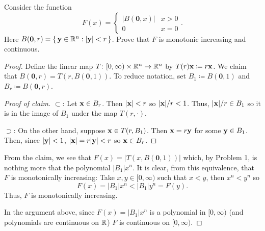 \begin{problem}
Consider the function
\[
F(x)=
\begin{cases}
|B(\mathbf{0},x)|&x>0\\
0&x=0
\end{cases}.
\]
Here
$B(\mathbf{0},r)=\left\{\,\mathbf{y}\in\mathbb{R}^n:|\mathbf{y}|<r\,\right\}$. Prove
that $F$ is monotonic increasing and continuous.
\end{problem}
\begin{proof}
Define the linear map $T\colon[0,\infty)\times\mathbb{R}^n\to\mathbb{R}^n$ by
$T(r)\mathbf{x}\coloneqq r\mathbf{x}$. We claim that
$B(\mathbf{0},r)=T(r,B(\mathbf{0},1))$. To reduce notation, set
$B_1\coloneqq B(\mathbf{0},1)$ and $B_r\coloneqq B(\mathbf{0},r)$.
\begin{proof}[Proof of claim]
\renewcommand{\qedsymbol}{$\clubsuit$}
$\subset$: Let $\mathbf{x}\in B_r$. Then $|\mathbf{x}|<r$ so $|\mathbf{x}|/r<1$. Thus,
$|\mathbf{x}|/r\in B_1$ so it is in the image of $B_1$ under the map
$T(r,\cdot)$.

$\supset$: On the other hand, suppose $\mathbf{x}\in T(r,B_1)$. Then
$\mathbf{x}=r\mathbf{y}$ for some $\mathbf{y}\in B_1$. Then, since $|\mathbf{y}|<1$,
$|\mathbf{x}|=r|\mathbf{y}|<r$ so $\mathbf{x}\in B_r$.
\end{proof}

From the claim, we see that $F(x)=|T(x,B(\mathbf{0},1))|$ which, by Problem
1, is nothing more that the polynomial $|B_1|x^n$. It is clear,
from this equivalence, that $F$ is monotonically increasing: Take
$x,y\in[0,\infty)$ such that $x<y$, then $x^n<y^n$ so
\begin{equation}
\label{eq:prep:1:7}
F(x)=|B_1|x^n<|B_1|y^n=F(y).
\end{equation}
Thus, $F$ is monotonically increasing.

In the argument above, since $F(x)=|B_1|x^n$ is a polynomial in
$[0,\infty)$ (and polynomials are continuous on $\mathbb{R}$) $F$ is continuous
on $[0,\infty)$.
\end{proof}

